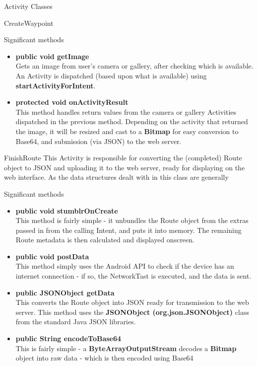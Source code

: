 \documentclass{article}
\begin{document}
\begin{section}{Activity Classes}
\begin{subsection}{CreateWaypoint}
\begin{subsubsection}{Significant methods}
\begin{itemize}
					\item{{\bf public void getImage} \\
					Gets an image from user's camera or gallery, after checking which is available. An Activity is dispatched (based upon what is available) using {\bf startActivityForIntent}.}
					
					\item{{\bf protected void onActivityResult} \\
					This method handles return values from the camera or gallery Activities dispatched in the previous method. Depending on the activity that returned the image, it will be resized and cast to a {\bf Bitmap} for easy conversion to Base64, and submission (via JSON) to the web server.}
				\end{itemize}
			\end{subsubsection}
		\end{subsection}
		
		\newpage
		\begin{subsection}{FinishRoute}
		This Activity is responsible for converting the (completed) Route object to JSON and uploading it to the web server, ready for displaying on the web interface. As the data structures dealt with in this class are generally 
			\begin{subsubsection}{Significant methods}
				\begin{itemize}
					\item{{\bf public void stumblrOnCreate} \\
					This method is fairly simple - it unbundles the Route object from the extras passed in from the calling Intent, and puts it into memory. The remaining Route metadata is then calculated and displayed onscreen.}
					\item{{\bf public void postData} \\
					This method simply uses the Android API to check if the device has an internet connection - if so, the NetworkTast is executed, and the data is sent.}
					
					\item{{\bf public JSONObject getData} \\
					This converts the Route object into JSON ready for transmission to the web server. This method uses the {\bf JSONObject (org.json.JSONObject)} class from the standard Java JSON libraries.}
					
					\item{{\bf public String encodeToBase64} \\
					This is fairly simple - a {\bf ByteArrayOutputStream} decodes a {\bf Bitmap} object into raw data - which is then encoded using Base64}
				\end{itemize}
			\end{subsubsection}
		\end{subsection}
		

\end{section}
\end{document}
